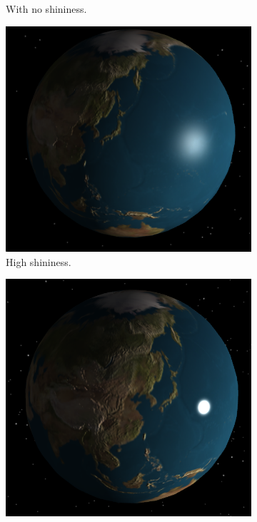 \documentclass[12pt]{article}
\begin{document}
\begin{figure}[H]
\begin{subfigure}[b]{0.3\textwidth}
                \caption{With no shininess.}
                \label{fig:Specular 2.}
	 \end{subfigure}
	         \begin{subfigure}[b]{0.3\textwidth}
                \includegraphics[width=\textwidth]{images/specular3}
                \caption{High shininess.}
                \label{fig:Specular 3.}
	 \end{subfigure}
	         \begin{subfigure}[b]{0.3\textwidth}
                \includegraphics[width=\textwidth]{images/specular4}

\end{subfigure}
\end{figure}
\end{document}
